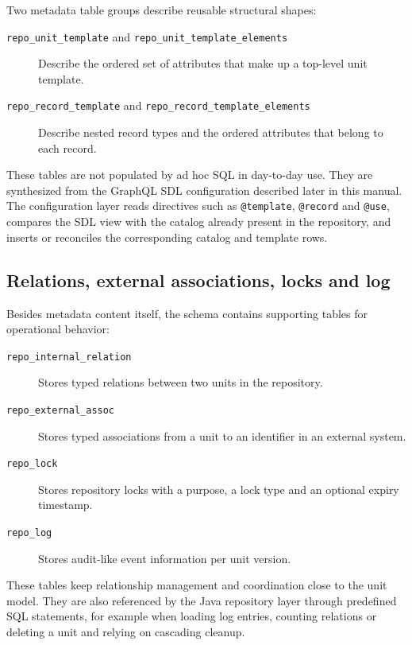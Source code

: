 Two metadata table groups describe reusable structural shapes:
\begin{description}
\item[\texttt{repo\_unit\_template} and \texttt{repo\_unit\_template\_elements}] Describe the ordered set of attributes that make up a top-level unit template.
\vspace{.2cm}
\item[\texttt{repo\_record\_template} and \texttt{repo\_record\_template\_elements}] Describe nested record types and the ordered attributes that belong to each record.
\end{description}

These tables are not populated by ad hoc SQL in day-to-day use. They are synthesized from the GraphQL SDL configuration described later in this manual. The configuration layer reads directives such as \texttt{@template}, \texttt{@record} and \texttt{@use}, compares the SDL view with the catalog already present in the repository, and inserts or reconciles the corresponding catalog and template rows.

\subsection{Relations, external associations, locks and log}

Besides metadata content itself, the schema contains supporting tables for operational behavior:
\begin{description}
\item[\texttt{repo\_internal\_relation}] Stores typed relations between two units in the repository.
\vspace{.2cm}
\item[\texttt{repo\_external\_assoc}] Stores typed associations from a unit to an identifier in an external system.
\vspace{.2cm}
\item[\texttt{repo\_lock}] Stores repository locks with a purpose, a lock type and an optional expiry timestamp.
\vspace{.2cm}
\item[\texttt{repo\_log}] Stores audit-like event information per unit version.
\end{description}

These tables keep relationship management and coordination close to the unit model. They are also referenced by the Java repository layer through predefined SQL statements, for example when loading log entries, counting relations or deleting a unit and relying on cascading cleanup.

